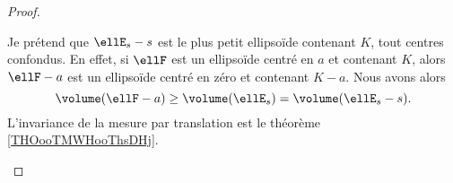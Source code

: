 \begin{proof}
\begin{subproof}
		Je prétend que \( \ellE_s-s\) est le plus petit ellipsoïde contenant \( K\), tout centres confondus. En effet, si \( \ellF\) est un ellipsoïde centré en \( a\) et contenant \( K\), alors \( \ellF-a\) est un ellipsoïde centré en zéro et contenant \( K-a\). Nous avons alors
		\begin{equation}
			\volume(\ellF-a)\geq \volume(\ellE_s)=\volume(\ellE_s-s).
		\end{equation}
		L'invariance de la mesure par translation est le théorème \ref{THOooTMWHooThsDHj}.
	\end{subproof}
\end{proof}
